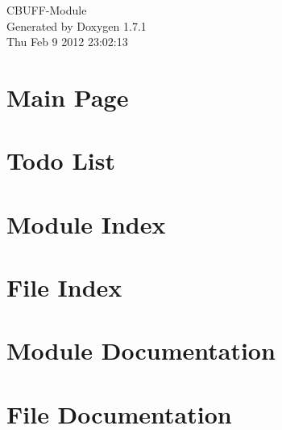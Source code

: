 \documentclass[a4paper]{book}
\begin{document}
\hypersetup{pageanchor=false}
\begin{titlepage}
\vspace*{7cm}
\begin{center}
{\Large CBUFF-\/Module }\\
\vspace*{1cm}
{\large Generated by Doxygen 1.7.1}\\
\vspace*{0.5cm}
{\small Thu Feb 9 2012 23:02:13}\\
\end{center}
\end{titlepage}
\clearemptydoublepage
{}
\tableofcontents
\clearemptydoublepage
{}
\hypersetup{pageanchor=true}
\chapter{Main Page}
\label{index}\hypertarget{index}{}
\chapter{Todo List}
\label{todo}
\hypertarget{todo}{}

\chapter{Module Index}

\chapter{File Index}

\chapter{Module Documentation}









\chapter{File Documentation}


\printindex
\end{document}
